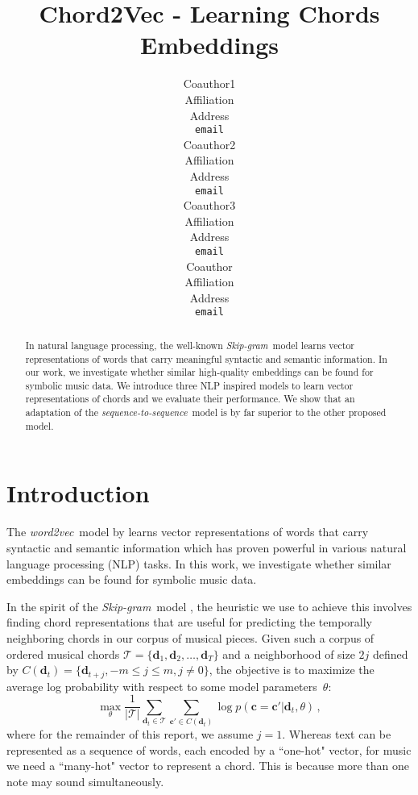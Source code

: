 \documentclass{article}
\title{Chord2Vec - Learning Chords Embeddings}
\author{
   Coauthor1 \\
   Affiliation \\
   Address \\
   \texttt{email} \\
   \And
   Coauthor2 \\
   Affiliation \\
   Address \\
   \texttt{email} \\
   \AND
   Coauthor3 \\
   Affiliation \\
   Address \\
   \texttt{email} \\
  \And
   Coauthor \\
   Affiliation \\
   Address \\
   \texttt{email} \\
}
\newcommand{\T}{\mathcal{T}}
\newcommand{\boldc}{\boldsymbol c}
\newcommand{\boldd}{\boldsymbol d}
\newcommand{\skipgram}{\textit{Skip-gram}}
\newcommand{\wordtovec}{\textit{word2vec}}
\newcommand{\seqtoseq}{\textit{sequence-to-sequence}}
\begin{document}

\maketitle

\begin{abstract}
  In natural language processing, the well-known \skipgram\ model learns vector representations of words that carry meaningful syntactic and semantic information. In our work, we investigate whether similar high-quality embeddings can be found for symbolic music data. We introduce three NLP inspired models to learn vector representations of chords and we evaluate their performance. We show that an adaptation of the \seqtoseq\ model is by far superior to the other proposed model. 
  
\end{abstract}

\section{Introduction}

The \wordtovec\ model by \citet{mik2013} learns vector representations of words that carry syntactic and semantic information which has proven powerful in various natural language processing (NLP) tasks. In this work, we investigate whether similar embeddings can be found for symbolic music data. %

In the spirit of the \skipgram\ model \citep{mik2013}, the heuristic we use to achieve this involves finding chord representations that are useful for predicting the temporally neighboring chords in our corpus of musical pieces. Given such a corpus of ordered musical chords  $\T = \{\boldd_1, \boldd_2, \ldots, \boldd_T\}$ and a neighborhood of size $2j$ defined by $ C(\boldd_t) = \{\boldd_{t+j}, -m \leq j \leq m , j \neq 0\}$, the objective is to maximize the average log probability with respect to some model parameters~$\theta$:
%
\begin{equation}
\max_{\theta} \frac{1}{|\T|}\sum_{\boldd_t \in \T} \sum_{\boldc' \in C(\boldd_t)} \log p(\boldc = \boldc'|\boldd_t, \theta)
 \,,
\label{eq:c2v_obj}
\end{equation} 
%
where for the remainder of this report, we assume $j=1$.
Whereas text can be represented as a sequence of words, each encoded by a ``one-hot" vector, for music we need a ``many-hot" vector to represent a chord. This is because more than one note may sound simultaneously.
\end{document}
